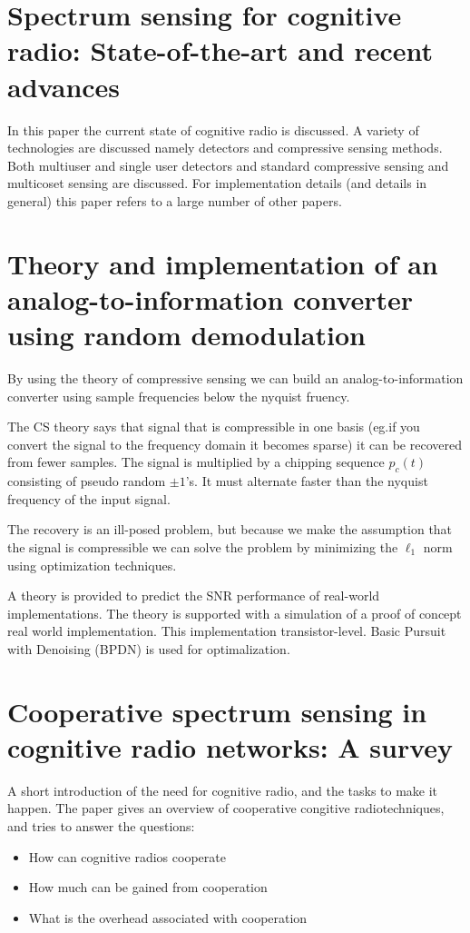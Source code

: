 \documentclass[report, oneside, a4paper, openany]{memoir}
\begin{document}
\section{Spectrum sensing for cognitive radio: State-of-the-art and recent advances \cite{axell2012spectrum}}

In this paper the current state of cognitive radio is discussed. A variety of technologies are discussed namely detectors and compressive sensing methods. Both multiuser and single user detectors and standard compressive sensing and multicoset sensing are discussed. For implementation details (and details in general) this paper refers to a large number of other papers.
\section{Theory and implementation of an analog-to-information converter using random demodulation \cite{laska2007theory}}
By using the theory of compressive sensing we can build an analog-to-information converter using sample frequencies below the nyquist fruency.

The CS theory says that signal that is compressible in one basis (eg.if you convert the signal to the frequency domain it becomes sparse) it can be recovered from fewer samples. The signal is multiplied by a chipping sequence $p_c(t)$ consisting of pseudo random $\pm1$'s. It must alternate faster than the nyquist frequency of the input signal.

The recovery is an ill-posed problem, but because we make the assumption that the signal is compressible we can solve the problem by minimizing the $\ell_1$ norm using optimization techniques.

A theory is provided to predict the SNR performance of real-world implementations. The theory is supported with a simulation of a proof of concept real world implementation. This implementation transistor-level. Basic Pursuit with Denoising (BPDN) is used for optimalization.
\section{Cooperative spectrum sensing in cognitive radio networks: A survey \cite{akyildiz2011cooperative}}
%
A short introduction of the need for cognitive radio, and the tasks to make it happen.
The paper gives an overview of cooperative congitive radiotechniques, and tries to answer the questions:

\begin{itemize}
\item How can cognitive radios cooperate 
\item How much can be gained from cooperation 
\item What is the overhead associated with cooperation
\end{itemize}
\end{document}
